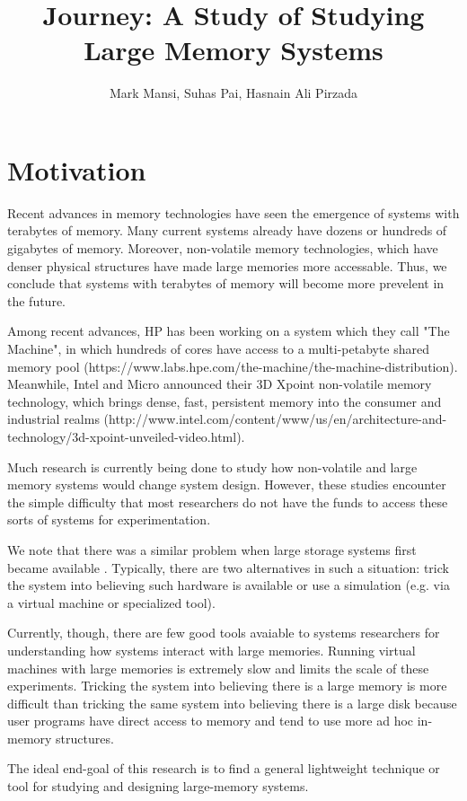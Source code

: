 \documentclass[twocolumn,11pt]{article}
\title{Journey: A Study of Studying Large Memory Systems}
\author{Mark Mansi, Suhas Pai, Hasnain Ali Pirzada}
\date{}
\begin{document}
\maketitle

\section{Motivation}

Recent advances in memory technologies have seen the emergence of systems with
terabytes of memory. Many current systems already have dozens or hundreds of
gigabytes of memory. Moreover, non-volatile memory technologies, which have
denser physical structures have made large memories more accessable. Thus, we
conclude that systems with terabytes of memory will become more prevelent in the
future.

Among recent advances, HP has been working on a system which they call "The
Machine", in which hundreds of cores have access to a multi-petabyte shared
memory pool (https://www.labs.hpe.com/the-machine/the-machine-distribution). Meanwhile, Intel and Micro announced their 3D Xpoint
non-volatile memory technology, which brings dense, fast, persistent memory into
the consumer and industrial realms (http://www.intel.com/content/www/us/en/architecture-and-technology/3d-xpoint-unveiled-video.html).

Much research is currently being done to study how non-volatile and large
memory systems would change system design. However, these studies encounter the
simple difficulty that most researchers do not have the funds to access these
sorts of systems for experimentation.

We note that there was a similar problem when large storage systems first became
available \cite{david, exalt}. Typically, there are two alternatives in
such a situation: trick the system into believing such hardware is available or
use a simulation (e.g. via a virtual machine or specialized tool).

Currently, though, there are few good tools avaiable to systems researchers for
understanding how systems interact with large memories. Running virtual machines
with large memories is extremely slow and limits the scale of these experiments.
Tricking the system into believing there is a large memory is more difficult
than tricking the same system into believing there is a large disk because user
programs have direct access to memory and tend to use more ad hoc in-memory
structures.

The ideal end-goal of this research is to find a general lightweight technique
or tool for studying and designing large-memory systems.
\end{document}
